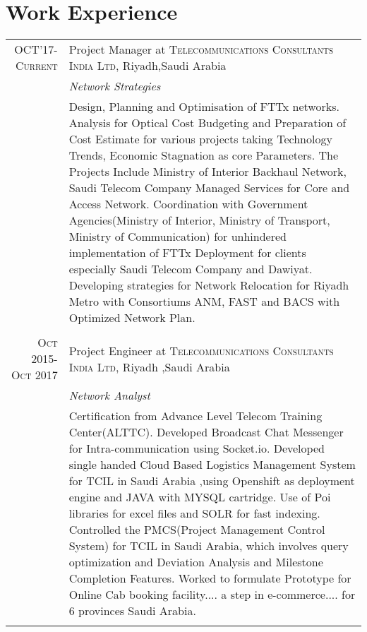 \documentclass[a4paper,10pt]{article}
\begin{document}
\section{Work Experience}
\begin{tabular}{r|p{11cm}}
 \textsc{OCT'17-Current} & Project Manager at \textsc{Telecommunications Consultants India Ltd}, Riyadh,Saudi Arabia \\ &\emph{Network Strategies}\\&\footnotesize{Design, Planning and Optimisation of FTTx networks.\newline
 Analysis for Optical Cost Budgeting and Preparation of Cost Estimate for various projects taking Technology Trends, Economic Stagnation as core Parameters. The Projects Include Ministry of Interior Backhaul Network, Saudi Telecom Company Managed Services for Core and Access Network.\newline 
 Coordination with Government Agencies(Ministry of Interior, Ministry of Transport, Ministry of Communication) for unhindered implementation of FTTx Deployment for clients especially Saudi Telecom Company and Dawiyat.\newline
 Developing strategies for Network Relocation for Riyadh Metro with Consortiums ANM, FAST and BACS with Optimized Network Plan.
}\\\multicolumn{2}{c}{} \\
 \textsc{Oct 2015- Oct 2017} & Project Engineer at \textsc{Telecommunications Consultants India Ltd}, Riyadh ,Saudi Arabia \\&\emph{Network Analyst}\\&\footnotesize{ Certification from Advance Level Telecom Training Center(ALTTC).\newline
 Developed Broadcast Chat Messenger for Intra-communication using Socket.io.\newline
Developed single handed Cloud Based Logistics Management System for TCIL in Saudi Arabia ,using Openshift as deployment engine and JAVA with MYSQL cartridge. Use of Poi libraries for excel files and SOLR for fast indexing.\newline
Controlled the PMCS(Project Management Control System) for TCIL in Saudi Arabia, which involves query optimization and Deviation Analysis and Milestone Completion Features.\newline
 Worked to formulate Prototype for Online Cab booking facility.... a step in e-commerce.... for 6 provinces Saudi  Arabia.}\\\multicolumn{2}{c}{} \\

\end{tabular}
\end{document}
